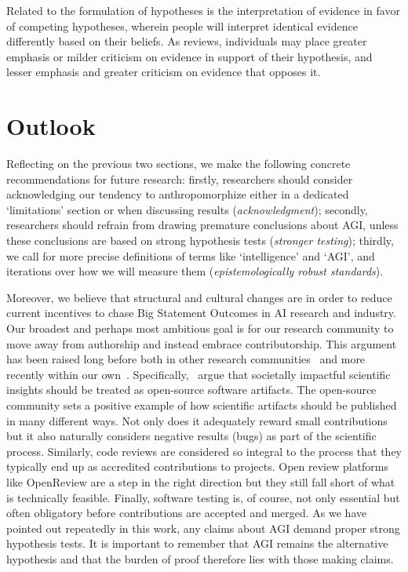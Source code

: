 Related to the formulation of hypotheses is the interpretation of evidence in favor of competing hypotheses, wherein people will interpret identical evidence differently based on their beliefs. As \citet{nickerson1998confirmation} reviews, individuals may place greater emphasis or milder criticism on evidence in support of their hypothesis, and lesser emphasis and greater criticism on evidence that opposes it. 

\section{Outlook}\label{outlook}

Reflecting on the previous two sections, we make the following concrete recommendations for future research: firstly, researchers should consider acknowledging our tendency to anthropomorphize either in a dedicated ‘limitations’ section or when discussing results (\textit{acknowledgment}); secondly, researchers should refrain from drawing premature conclusions about AGI, unless these conclusions are based on strong hypothesis tests (\textit{stronger testing}); thirdly, we call for more precise definitions of terms like ‘intelligence’ and ‘AGI’, and iterations over how we will measure them (\textit{epistemologically robust standards}).

Moreover, we believe that structural and cultural changes are in order to reduce current incentives to chase Big Statement Outcomes in AI research and industry. Our broadest and perhaps most ambitious goal is for our research community to move away from authorship and instead embrace contributorship. This argument has been raised long before both in other research communities~\citep{smith1997authorship} and more recently within our own~\citep{liem2023treat}. Specifically,~\citet{liem2023treat} argue that societally impactful scientific insights should be treated as open-source software artifacts. The open-source community sets a positive example of how scientific artifacts should be published in many different ways. Not only does it adequately reward small contributions but it also naturally considers negative results (bugs) as part of the scientific process. Similarly, code reviews are considered so integral to the process that they typically end up as accredited contributions to projects. Open review platforms like OpenReview are a step in the right direction but they still fall short of what is technically feasible. Finally, software testing is, of course, not only essential but often obligatory before contributions are accepted and merged. As we have pointed out repeatedly in this work, any claims about AGI demand proper strong hypothesis tests. It is important to remember that AGI remains the alternative hypothesis and that the burden of proof therefore lies with those making claims. 

